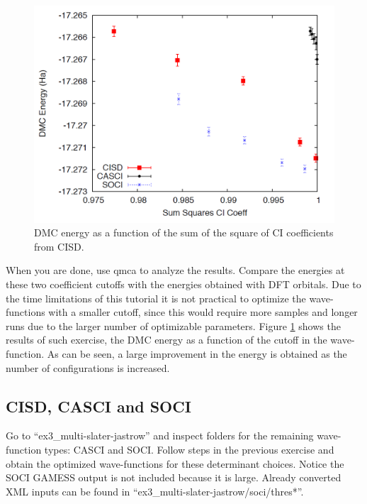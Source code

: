 \begin{figure}
\begin{center}
\includegraphics[trim = 0mm 0mm 0mm 0mm, clip,width=0.75\columnwidth]{figures/lab_advanced_molecules_dmc_ci_cisd.png}
\end{center}
\caption{DMC energy as a function of the sum of the square of CI coefficients from CISD.}
\label{fig:lam_dmc_ci_cisd}
\end{figure}

When you are done, use qmca to analyze the results. Compare the energies at these two
coefficient cutoffs with the energies obtained with DFT orbitals. Due to the time limitations of this tutorial it is not practical to optimize the wave-functions with a smaller cutoff, since this would require more samples and longer runs due to the larger number of optimizable parameters. Figure \ref{fig:lam_dmc_ci_cisd} shows the results of such exercise, the DMC energy as a function of the cutoff in the wave-function. As can be seen, a large improvement in the energy is obtained as the number of configurations is increased.



\subsection{CISD, CASCI and SOCI}

Go to “ex3\_multi-slater-jastrow” and inspect folders for the remaining wave-function types: CASCI and SOCI. Follow steps in the previous exercise and obtain the optimized wave-functions for these determinant choices. Notice the SOCI GAMESS output is not included because it is large. Already converted XML inputs can be found in ``ex3\_multi-slater-jastrow/soci/thres*''. %

